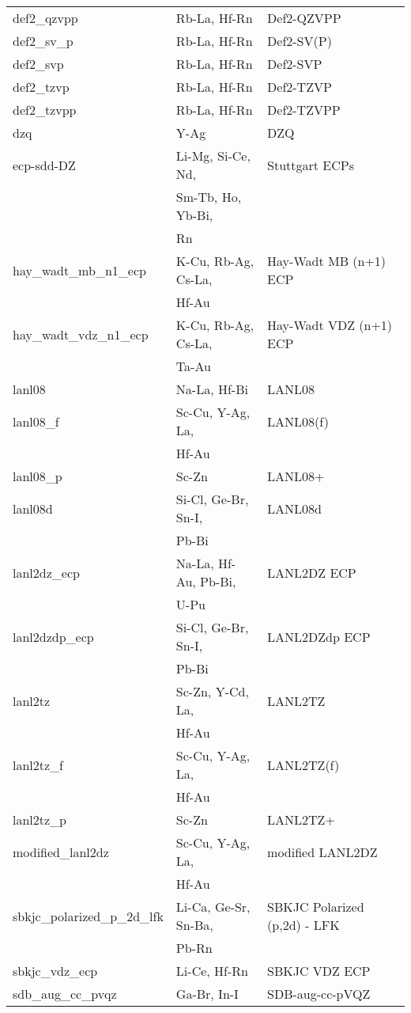 \begin{longtable}{lll}
def2\_qzvpp & Rb-La, Hf-Rn & Def2-QZVPP\\
def2\_sv\_p & Rb-La, Hf-Rn & Def2-SV(P)\\
def2\_svp & Rb-La, Hf-Rn & Def2-SVP\\
def2\_tzvp & Rb-La, Hf-Rn & Def2-TZVP\\
def2\_tzvpp & Rb-La, Hf-Rn & Def2-TZVPP\\
dzq & Y-Ag & DZQ\\
ecp-sdd-DZ & Li-Mg, Si-Ce, Nd, & Stuttgart ECPs\\
           & Sm-Tb, Ho, Yb-Bi, & \\
           & Rn  & \\
hay\_wadt\_mb\_n1\_ecp & K-Cu, Rb-Ag, Cs-La, & Hay-Wadt MB (n+1) ECP\\
 & Hf-Au & \\
hay\_wadt\_vdz\_n1\_ecp & K-Cu, Rb-Ag, Cs-La, & Hay-Wadt VDZ (n+1) ECP\\
 & Ta-Au & \\
lanl08 & Na-La, Hf-Bi & LANL08\\
lanl08\_f & Sc-Cu, Y-Ag, La, & LANL08(f)\\
		  & Hf-Au & \\
lanl08\_p & Sc-Zn & LANL08+\\
lanl08d & Si-Cl, Ge-Br, Sn-I, & LANL08d\\
		& Pb-Bi & \\
lanl2dz\_ecp & Na-La, Hf-Au, Pb-Bi, & LANL2DZ ECP\\
 & U-Pu & \\
lanl2dzdp\_ecp & Si-Cl, Ge-Br, Sn-I, & LANL2DZdp ECP\\
				  & Pb-Bi & \\
lanl2tz & Sc-Zn, Y-Cd, La, & LANL2TZ\\
				  & Hf-Au & \\
lanl2tz\_f & Sc-Cu, Y-Ag, La, & LANL2TZ(f)\\
				  & Hf-Au & \\
lanl2tz\_p & Sc-Zn & LANL2TZ+\\
modified\_lanl2dz & Sc-Cu, Y-Ag, La, & modified LANL2DZ\\
				  & Hf-Au & \\
sbkjc\_polarized\_p\_2d\_lfk & Li-Ca, Ge-Sr, Sn-Ba, & SBKJC Polarized (p,2d) - LFK\\
 & Pb-Rn & \\
sbkjc\_vdz\_ecp & Li-Ce, Hf-Rn & SBKJC VDZ ECP\\
sdb\_aug\_cc\_pvqz & Ga-Br, In-I & SDB-aug-cc-pVQZ\\

\end{longtable}
